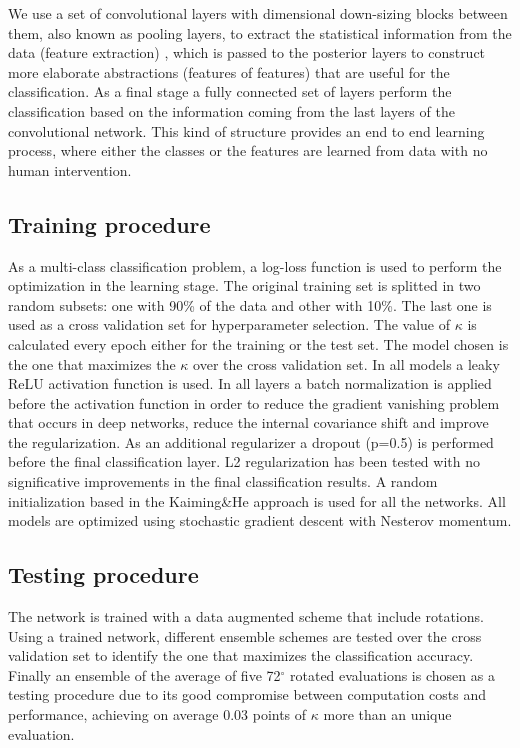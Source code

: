 \documentclass{IOS-Book-Article}
\newcommand{\degree}{\ensuremath{^{\circ}}\xspace}
\begin{document}
We use a set of convolutional layers with dimensional down-sizing blocks between them, also known as pooling layers, to extract the statistical information from the data (feature extraction) , which is passed to the posterior layers to construct more elaborate abstractions (features of features) that are useful for the classification. As a final stage a fully connected set of layers perform the classification based on the information coming from the last layers of the convolutional network. This kind of structure provides an end to end learning process, where either the classes or the features are learned from data with no human intervention.

\subsection{Training procedure}

As a multi-class classification problem, a log-loss function is used to perform the optimization in the learning stage. The original training set is splitted in two random subsets: one with 90\% of the data and other with 10\%. The last one is used as a cross validation set for hyperparameter selection. The value of $\kappa$ is calculated every epoch either for the training or the test set. The model chosen is the one that maximizes the $\kappa$ over the cross validation set. In all models a leaky ReLU\cite{Dahl2013} activation function is used. In all layers a batch normalization \cite{batch-norm} is applied before the activation function in order to reduce the gradient vanishing problem that occurs in deep networks, reduce the internal covariance shift and improve the regularization. As an additional regularizer a dropout \cite{baldi2013} (p=0.5) is performed before the final classification layer. L2 regularization has been tested with no significative improvements in the final classification results. A random initialization based in the Kaiming\&He approach\cite{kaiming} is used for all the networks. All models are optimized using stochastic gradient descent with Nesterov momentum.

\subsection{Testing procedure}

The network is trained with a data augmented scheme that include rotations.  Using a trained network, different ensemble\cite{ensembling} schemes are tested over the cross validation set to identify the one that maximizes the classification accuracy. Finally an ensemble of the average of five 72\degree rotated evaluations is chosen as a testing procedure due to its good compromise between computation costs and performance, achieving on average 0.03 points of $\kappa$ more than an unique evaluation.
\end{document}
